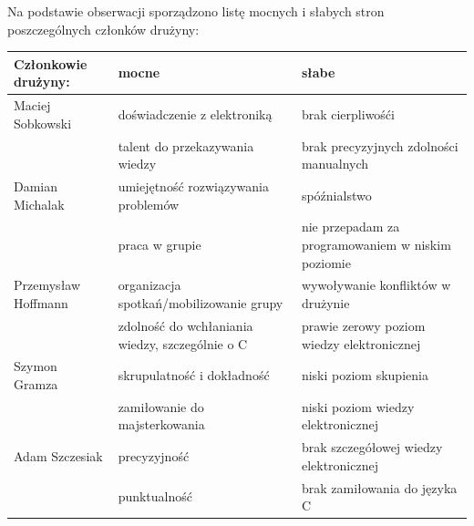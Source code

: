 \documentclass[11pt,a4paper]{article}
\begin{document}
  Na podstawie obserwacji sporządzono listę mocnych i słabych stron poszczególnych członków drużyny:
  \begin{center}
\begin{tabularx}{\linewidth}{lll}
  \hline 
  Członkowie drużyny: & mocne & słabe\\
  \hline
  Maciej Sobkowski & doświadczenie z elektroniką & brak cierpliwośći \\
                  & talent do przekazywania wiedzy & brak precyzyjnych zdolności manualnych  \\
  \hline              
  Damian Michalak & umiejętność rozwiązywania problemów & spóźnialstwo \\
                  & praca w grupie & nie przepadam za programowaniem w niskim poziomie \\
  \hline
  Przemysław Hoffmann & organizacja spotkań/mobilizowanie grupy & wywoływanie konfliktów w drużynie \\
                      & zdolność do wchłaniania wiedzy, szczególnie o C & prawie zerowy poziom wiedzy elektronicznej \\
  \hline
  Szymon Gramza & skrupulatność i dokładność & niski poziom skupienia \\
                & zamiłowanie do majsterkowania & niski poziom wiedzy elektronicznej \\
  \hline
  Adam Szczesiak & precyzyjność & brak szczegółowej wiedzy elektronicznej \\
                 & punktualność & brak zamiłowania do języka C \\
  \hline  
  \hline
\end{tabularx} 
\end{center}
  
  
\end{document}

